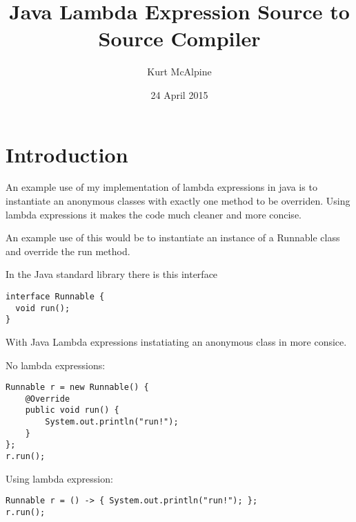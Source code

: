 \documentclass[twocolumn]{report}
\begin{document}
\title{Java Lambda Expression Source to Source Compiler}
\author{Kurt McAlpine}
\date{24 April 2015}
\maketitle

\chapter{Introduction}
An example use of my implementation of lambda expressions in java is to
instantiate an anonymous classes with exactly one method to be overriden. Using
lambda expressions it makes the code much cleaner and more concise.

An example use of this would be to instantiate an instance of a Runnable class
and override the run method.\cite{Ierusalimschy:2007:EL:1238844.1238846}

In the Java standard library there is this interface
\begin{lstlisting}
interface Runnable {
  void run();
}
\end{lstlisting}
With Java Lambda expressions instatiating an anonymous class in more consice.

No lambda expressions:
\begin{lstlisting}
Runnable r = new Runnable() {
	@Override
	public void run() {
		System.out.println("run!");
	}
};
r.run();
\end{lstlisting}
Using lambda expression:
\begin{lstlisting}
Runnable r = () -> { System.out.println("run!"); };    	
r.run();
\end{lstlisting}



\end{document}

